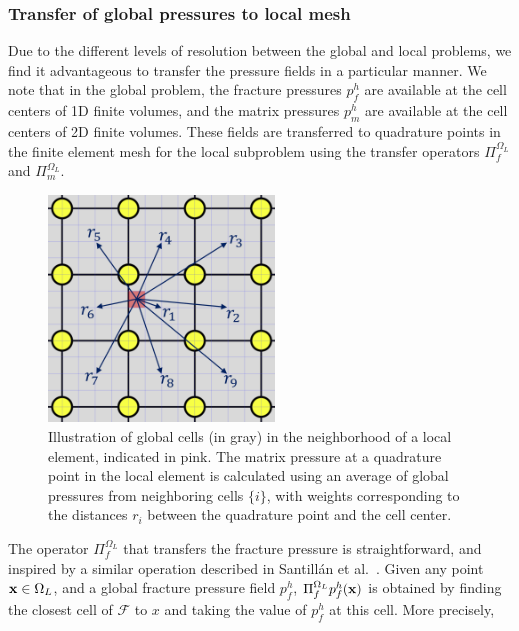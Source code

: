 \subsubsection{Transfer of global pressures to local mesh}
\label{sec:pressure_projection}

Due to the different levels of resolution between the global and local problems, we find it advantageous to transfer the pressure fields in a particular manner.  We note that in the global problem, the fracture pressures $p_f^h$ are available at the cell centers of 1D finite volumes, and the matrix pressures $p_m^h$ are available at the cell centers of 2D finite volumes.  These fields are transferred to quadrature points in the finite element mesh for the local subproblem using the transfer operators 
$\Pi^{\Omega_L}_f$ and $\Pi^{\Omega_L}_m$.

\begin{figure}[!htbp]
    \centering
    \includegraphics[width=6cm]{img/Section2/pressure_interpolation_blue_small.png}
    \caption{Illustration of global cells (in gray) in the neighborhood of a local element, indicated in pink. The matrix pressure at a quadrature point in the local element is calculated using an average of global pressures from neighboring cells $\{ i \}$, with weights corresponding to the distances $r_i$ between the quadrature point and the cell center.}
    \label{fig:pressure_interpolation}
\end{figure}

The operator $\Pi^{\Omega_L}_f$ that transfers the fracture pressure is straightforward, and inspired by a similar operation described in Santillán et al.\ \cite{santillan2018phase}. Given any point $ {\bf{x}} \in \Omega_L$, and a global fracture pressure field $p_f^h$, $\Pi^{\Omega_L}_fp_f^h({\bf{x}})$ is obtained by finding the closest cell of $\mathcal{F}$ to $x$ and taking the value of $p_f^h$ at this cell. More precisely,

